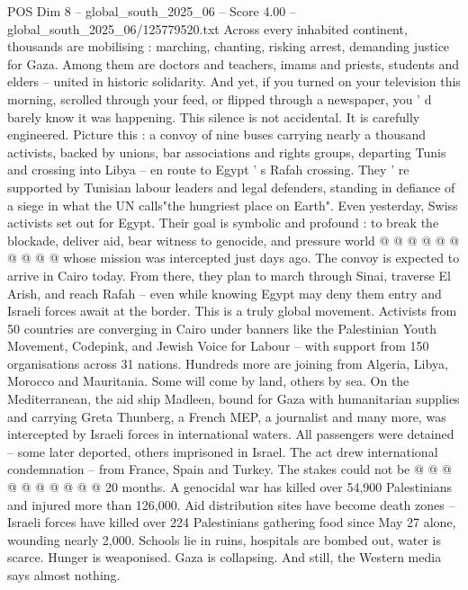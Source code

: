 \begin{textsample}{POS Dim 8 – global\_south\_2025\_06 – Score 4.00 – global\_south\_2025\_06/125779520.txt}  \label{ex:f8_pos_196}
Across every inhabited continent, thousands are mobilising : marching, chanting, risking arrest, demanding justice for Gaza.
Among them are doctors and teachers, imams and priests, students and elders -- united in historic solidarity.
And yet, if you turned on your television this morning, scrolled through your feed, or flipped through a newspaper, you ' d barely know it was happening.
This silence is not accidental.
It is carefully engineered.
Picture this : a convoy of nine buses carrying nearly a thousand activists, backed by unions, bar associations and rights groups, departing Tunis and crossing into Libya -- en route to Egypt ' s Rafah crossing.
They ' re supported by Tunisian labour leaders and legal defenders, standing in defiance of a siege in what the UN calls"the hungriest place on Earth".
Even yesterday, Swiss activists set out for Egypt.
Their goal is symbolic and profound : to break the blockade, deliver aid, bear witness to genocide, and pressure world @ @ @ @ @ @ @ @ @ @ whose mission was intercepted just days ago.
The convoy is expected to arrive in Cairo today.
From there, they plan to march through Sinai, traverse El Arish, and reach Rafah -- even while knowing Egypt may deny them entry and Israeli forces await at the border.
This is a truly global movement.
Activists from 50 countries are converging in Cairo under banners like the Palestinian Youth Movement, Codepink, and Jewish Voice for Labour -- with support from 150 organisations across 31 nations.
Hundreds more are joining from Algeria, Libya, Morocco and Mauritania.
Some will come by land, others by sea.
On the Mediterranean, the aid ship Madleen, bound for Gaza with humanitarian supplies and carrying Greta Thunberg, a French MEP, a journalist and many more, was intercepted by Israeli forces in international waters.
All passengers were detained -- some later deported, others imprisoned in Israel.
The act drew international condemnation -- from France, Spain and Turkey.
The stakes could not be @ @ @ @ @ @ @ @ @ @ 20 months.
A genocidal war has killed over 54,900 Palestinians and injured more than 126,000.
Aid distribution sites have become death zones -- Israeli forces have killed over 224 Palestinians gathering food since May 27 alone, wounding nearly 2,000.
Schools lie in ruins, hospitals are bombed out, water is scarce.
Hunger is weaponised.
Gaza is collapsing.
And still, the Western media says almost nothing.

\end{textsample}
